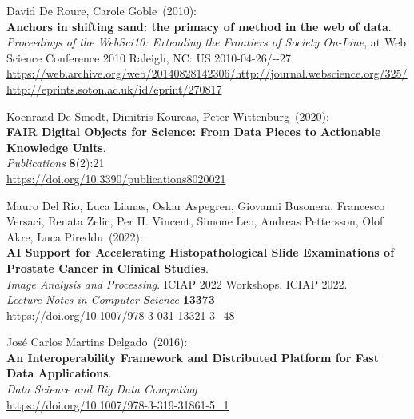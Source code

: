 \begin{thebibliography}{9}
David De Roure, Carole Goble~(2010): \\
\textbf{Anchors in shifting sand: the primacy of method in the web of data}. \\
\emph{Proceedings of the WebSci10: Extending the Frontiers of Society On-Line},
at Web Science Conference 2010 Raleigh, NC: US 2010-04-26/-{}-27\\
\url{https://web.archive.org/web/20140828142306/http://journal.webscience.org/325/}\\
\url{http://eprints.soton.ac.uk/id/eprint/270817} 

Koenraad De Smedt, Dimitris Koureas, Peter Wittenburg~(2020): \\
\textbf{FAIR Digital Objects for Science: From Data Pieces to Actionable Knowledge Units}.\\
\emph{Publications} \textbf{8}(2):21\\
\url{https://doi.org/10.3390/publications8020021}


Mauro Del Rio, Luca Lianas, Oskar Aspegren, Giovanni Busonera, Francesco Versaci, Renata Zelic, Per H. Vincent, Simone Leo, Andreas Pettersson, Olof Akre, Luca Pireddu~(2022): \\
\textbf{AI Support for Accelerating Histopathological Slide Examinations of Prostate Cancer in Clinical Studies}.\\
\emph{Image Analysis and Processing}. ICIAP 2022 Workshops. ICIAP 2022. \\
\emph{Lecture Notes in Computer Science} \textbf{13373}\\
\url{https://doi.org/10.1007/978-3-031-13321-3_48}

José Carlos Martins Delgado~(2016): \\
\textbf{An Interoperability Framework and Distributed Platform for Fast Data Applications}.\\
\emph{Data Science and Big Data Computing} \\
\url{https://doi.org/10.1007/978-3-319-31861-5_1}


\end{thebibliography}
